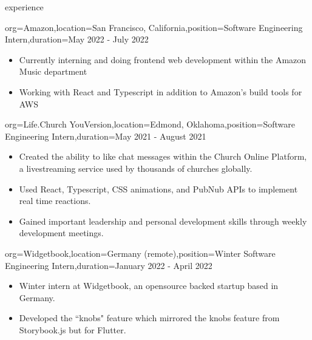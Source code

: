 \documentclass{resume}
\begin{document}
\begin{ResumeSection}{experience}
    \begin{ResumeSubsection}{org={Amazon},location={San Francisco, California},position={Software Engineering Intern},duration={May 2022 - July 2022}}
        \begin{itemize}
            \item Currently interning and doing frontend web development within
                the Amazon Music department
            \item Working with React and Typescript in addition to Amazon's
                build tools for AWS
        \end{itemize}
    \end{ResumeSubsection}

    \begin{ResumeSubsection}{org={Life.Church YouVersion},location={Edmond, Oklahoma},position={Software Engineering Intern},duration={May 2021 - August 2021}}
        \begin{itemize}
            \item {Created the ability to like chat messages within
                    the Church Online Platform, a livestreaming service used by
                thousands of churches globally.}
            \item {Used React, Typescript, CSS animations, and
                PubNub APIs to implement real time reactions.}
            \item Gained important leadership and personal development skills
                through weekly development meetings.
        \end{itemize}
    \end{ResumeSubsection}

    \begin{ResumeSubsection}{org={Widgetbook},location={Germany (remote)},position={Winter Software Engineering Intern},duration={January 2022 - April 2022}}
        \begin{itemize}
            \item Winter intern at Widgetbook, an opensource backed startup based in Germany.
            \item Developed the ``knobs" feature which mirrored the knobs feature from
                Storybook.js but for Flutter.
        \end{itemize}
    \end{ResumeSubsection}


\end{ResumeSection}
\end{document}
